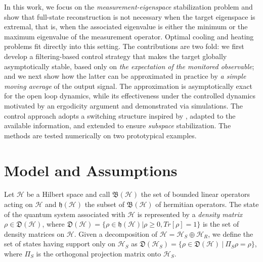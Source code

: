 \documentclass[conference]{IEEEtran}
\theoremstyle{plain}
\theoremstyle{plain}
\theoremstyle{plain}
\theoremstyle{plain}
\theoremstyle{remark}
\theoremstyle{definition}
\begin{document}
In this work, we focus on the {\em measurement-eigenspace} stabilization problem and show that full-state reconstruction is not necessary when the target eigenspace is extremal, that is, when the associated eigenvalue is either the minimum or the maximum eigenvalue of the measurement operator. Optimal cooling and heating problems fit directly into this setting.
The contributions are two fold: we first develop a filtering-based control strategy that makes the target globally asymptotically stable, based only on {\em the expectation of the monitored observable}; and we next show how the latter can be approximated in practice by {\em a simple moving average} of the output signal. The approximation is asymptotically exact for the open loop dynamics, while its effectiveness under the controlled dynamics motivated by an ergodicity argument and  demonstrated via simulations. The control approach adopts a switching structure inspired by \cite{mirrahimi,destab}, adapted to the available information, and extended to ensure {\em subspace} stabilization. The methods are tested numerically on two prototypical examples.

\section{Model and Assumptions}

Let $\mathcal H$ be a Hilbert space and call $\mathfrak B(\mathcal H)$ the set of bounded linear operators acting on $\mathcal H$ and $\mathfrak h(\mathcal H)$ the subset of $\mathfrak B(\mathcal H)$ of hermitian operators. The state of the quantum system associated with $\mathcal H$ is represented by a \emph{density matrix} $\rho \in \mathfrak D(\mathcal H)$, where $\mathfrak D(\mathcal H) = \{\rho \in \mathfrak h(\mathcal H) | \rho \ge 0, Tr[\rho] = 1\}$ is the set of density matrices on $\mathcal H$. Given a decomposition of $\mathcal H = \mathcal H_S \oplus \mathcal H_R$, we define the set of states having support only on $\mathcal H_S$ as $\mathfrak D(\mathcal H_S) = \{\rho \in \mathfrak D(\mathcal H)\ |\ \Pi_S \rho = \rho\}$, where $\Pi_S$ is the orthogonal projection matrix onto $\mathcal H_S$. 
\end{document}
